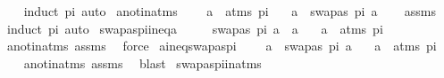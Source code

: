 \begin{isabellebody}
%
\isadelimproof
\ \ %
\endisadelimproof
%
\isatagproof
{}\isamarkupfalse%
\ {\isacharparenleft}{\kern0pt}induct\ pi{\isacharparenright}{\kern0pt}\ auto%
\endisatagproof
{\isafoldproof}%
%
\isadelimproof
\isanewline
%
\endisadelimproof
\isanewline
{}\isamarkupfalse%
\ a{\isacharunderscore}{\kern0pt}not{\isacharunderscore}{\kern0pt}in{\isacharunderscore}{\kern0pt}atms{\isacharcolon}{\kern0pt}\ \isanewline
\ \ \ {\isachardoublequoteopen}a\ {\isasymnotin}\ atms\ pi{\isachardoublequoteclose}\isanewline
\ \ \ {\isachardoublequoteopen}a\ {\isacharequal}{\kern0pt}\ swapas\ pi\ a{\isachardoublequoteclose}\isanewline
%
\isadelimproof
\ \ %
\endisadelimproof
%
\isatagproof
{}\isamarkupfalse%
\ assms\ \isamarkupfalse%
\ {\isacharparenleft}{\kern0pt}induct\ pi{\isacharparenright}{\kern0pt}\ auto%
\endisatagproof
{\isafoldproof}%
%
\isadelimproof
\isanewline
%
\endisadelimproof
\isanewline
{}\isamarkupfalse%
\ swapas{\isacharunderscore}{\kern0pt}pi{\isacharunderscore}{\kern0pt}ineq{\isacharunderscore}{\kern0pt}a{\isacharcolon}{\kern0pt}\ \isanewline
\ \ \ \ {\isachardoublequoteopen}swapas\ pi\ a\ {\isasymnoteq}\ a{\isachardoublequoteclose}\isanewline
\ \ \ {\isachardoublequoteopen}a\ {\isasymin}\ atms\ pi{\isachardoublequoteclose}\isanewline
%
\isadelimproof
\ \ %
\endisadelimproof
%
\isatagproof
{}\isamarkupfalse%
\ a{\isacharunderscore}{\kern0pt}not{\isacharunderscore}{\kern0pt}in{\isacharunderscore}{\kern0pt}atms\ assms\ \isamarkupfalse%
\ force%
\endisatagproof
{\isafoldproof}%
%
\isadelimproof
\isanewline
%
\endisadelimproof
\isanewline
{}\isamarkupfalse%
\ a{\isacharunderscore}{\kern0pt}ineq{\isacharunderscore}{\kern0pt}swapas{\isacharunderscore}{\kern0pt}pi{\isacharcolon}{\kern0pt}\ \isanewline
\ \ \ {\isachardoublequoteopen}a\ {\isasymnoteq}\ swapas\ pi\ a{\isachardoublequoteclose}\isanewline
\ \ \ {\isachardoublequoteopen}a\ {\isasymin}\ atms\ pi{\isachardoublequoteclose}\isanewline
%
\isadelimproof
\ \ %
\endisadelimproof
%
\isatagproof
{}\isamarkupfalse%
\ a{\isacharunderscore}{\kern0pt}not{\isacharunderscore}{\kern0pt}in{\isacharunderscore}{\kern0pt}atms\ assms\ \isamarkupfalse%
\ blast%
\endisatagproof
{\isafoldproof}%
%
\isadelimproof
\isanewline
%
\endisadelimproof
\isanewline
{}\isamarkupfalse%
\ swapas{\isacharunderscore}{\kern0pt}pi{\isacharunderscore}{\kern0pt}in{\isacharunderscore}{\kern0pt}atms{\isacharcolon}{\kern0pt}\ \isanewline

\end{isabellebody}
